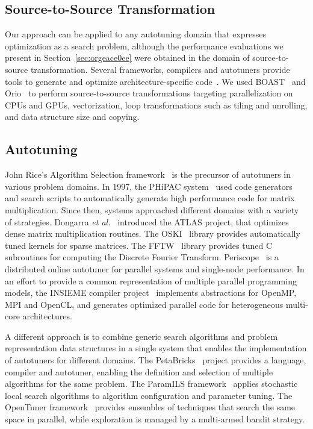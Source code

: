 \documentclass[conference]{IEEEtran}
\begin{document}
\subsection{Source-to-Source Transformation}
\label{sec:orge8340fb}
Our approach can be applied to any autotuning domain that expresses optimization
as  a  search  problem,  although  the performance  evaluations  we  present  in
Section~\ref{sec:orgeace0ee}  were obtained in the  domain of source-to-source
transformation. Several  frameworks, compilers  and autotuners provide  tools to
generate             and              optimize             architecture-specific
code~\cite{hartono2009annotation,videau2017boast,tiwari2009scalable,yi2007poet,ansel2009petabricks}.
We  used BOAST~\cite{videau2017boast}  and Orio~\cite{hartono2009annotation}  to
perform source-to-source  transformations targeting parallelization on  CPUs and
GPUs, vectorization, loop transformations such as tiling and unrolling, and data
structure size and copying.
\subsection{Autotuning}
\label{sec:orga21fad2}
John  Rice's  Algorithm   Selection  framework~\cite{rice1976algorithm}  is  the
precursor  of  autotuners  in  various  problem domains.  In  1997,  the  PHiPAC
system~\cite{bilmes1997optimizing} used  code generators  and search  scripts to
automatically generate  high performance  code for matrix  multiplication. Since
then,  systems  approached  different  domains with  a  variety  of  strategies.
Dongarra  \emph{et  al.}~\cite{dongarra1998automatically}  introduced  the  ATLAS
project,   that   optimizes   dense    matrix   multiplication   routines.   The
OSKI~\cite{vuduc2005oski}  library  provides  automatically  tuned  kernels  for
sparse  matrices.   The  FFTW~\cite{frigo1998fftw}  library  provides   tuned  C
subroutines     for     computing     the    Discrete     Fourier     Transform.
Periscope~\cite{gerndt2010automatic}  is  a  distributed  online  autotuner  for
parallel systems and  single-node performance. In an effort to  provide a common
representation  of multiple  parallel programming  models, the  INSIEME compiler
project~\cite{jordan2012multi}  implements  abstractions  for  OpenMP,  MPI  and
OpenCL,  and  generates optimized  parallel  code  for heterogeneous  multi-core
architectures.

A  different  approach is  to  combine  generic  search algorithms  and  problem
representation   data  structures   in  a   single  system   that  enables   the
implementation     of     autotuners      for     different     domains.     The
PetaBricks~\cite{ansel2009petabricks} project provides  a language, compiler and
autotuner, enabling the definition and  selection of multiple algorithms for the
same   problem.   The   ParamILS   framework~\cite{hutter2009paramils}   applies
stochastic  local search  algorithms  to algorithm  configuration and  parameter
tuning. The OpenTuner  framework~\cite{ansel2014opentuner} provides ensembles of
techniques that search the same space  in parallel, while exploration is managed
by a multi-armed bandit strategy.
\end{document}
